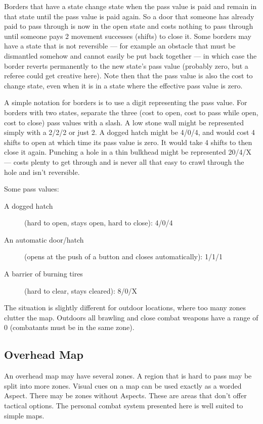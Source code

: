 Borders that have a state change state when the pass value is paid and remain in that state until the pass value is paid again. So a door that someone has already paid to pass through is now in the open state and costs nothing to pass through until someone pays 2 movement successes (shifts) to close it. Some borders may have a state that is not reversible --- for example an obstacle that must be dismantled somehow and cannot easily be put back together --- in which case the border reverts permanently to the new state's pass value (probably zero, but a referee could get creative here). Note then that the pass value is also the cost to change state, even when it is in a state where the effective pass value is zero.

A simple notation for borders is to use a digit representing the pass value. For borders with two states, separate the three (cost to open, cost to pass while open, cost to close) pass values with a slash. A low stone wall might be represented simply with a 2/2/2 or just 2. A dogged hatch might be 4/0/4, and would cost 4 shifts to open at which time its pass value is zero. It would take 4 shifts to then close it again. Punching a hole in a thin bulkhead might be represented 20/4/X --- costs plenty to get through and is never all that easy to crawl through the hole and isn't reversible.

Some pass values:

\begin{description}
\item[A dogged hatch] (hard to open, stays open, hard to close): 4/0/4
\item[An automatic door/hatch] (opens at the push of a button and closes automatically): 1/1/1
\item[A barrier of burning tires] (hard to clear, stays cleared): 8/0/X
\end{description}

The situation is slightly different for outdoor locations, where too many zones clutter the map.
Outdoors all brawling and close combat weapons have a range of 0 (combatants must be in the same zone).

\subsection{Overhead Map}
\label{sec:personal-combat-overhead-map}

An overhead map may have several zones. A region that is hard to pass may be split into more zones. Visual cues on a map can be used exactly as a worded Aspect. There may be zones without Aspects. These are areas that don't offer tactical options. The personal combat system presented here is well suited to simple maps.

